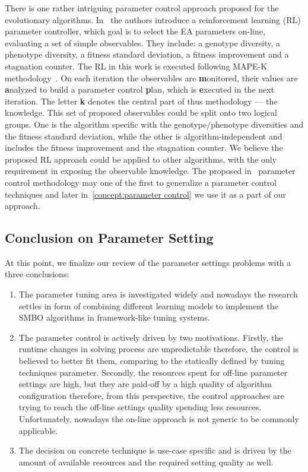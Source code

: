 There is one rather intriguing parameter control approach proposed for the evolutionary algorithms. In~\cite{karafotias2014generic} the authors introduce a reinforcement learning (RL) parameter controller, which goal is to select the EA parameters on-line, evaluating a set of simple observables. They include: a genotype diversity, a phenotype diversity, a fitness standard deviation, a fitness improvement and a stagnation counter.
The RL in this work is executed following MAPE-K methodology~\cite{brun2009engineering}. On each iteration the observables are \textbf{m}onitored, their values are \textbf{a}nalyzed to build a parameter control \textbf{p}lan, which is \textbf{e}xecuted in the next iteration. The letter \textbf{k} denotes the central part of thus methodology — the knowledge.
This set of proposed observables could be split onto two logical groups. One is the algorithm specific with the genotype/phenotype diversities and the fitness standard deviation, while the other is algorithm-independent and includes the fitness improvement and the stagnation counter. We believe the proposed RL approach could be applied to other algorithms, with the only requirement in exposing the observable knowledge. The proposed in~\cite{karafotias2014generic} parameter control methodology may one of the first to generalize a parameter control techniques and later in~\cref{concept:parameter control} we use it as a part of our approach.


\subsection{Conclusion on Parameter Setting}\label{bg: parameter setting conclution}
At this point, we finalize our review of the parameter settings problems with a three conclusions:
\begin{enumerate}
	\item The parameter tuning area is investigated widely and nowadays the research settles in form of combining different learning models to implement the SMBO algorithms in framework-like tuning systems.
	
	\item The parameter control is actively driven by two motivations. Firstly, the runtime changes in solving process are unpredictable therefore, the control is believed to better fit them, comparing to the statically defined by tuning techniques parameter. Secondly, the resources spent for off-line parameter settings are high, but they are paid-off by a high quality of algorithm configuration therefore, from this perspective, the control approaches are trying to reach the off-line settings quality spending less resources. Unfortunately, nowadays the on-line approach is not generic to be commonly applicable.
	
	\item The decision on concrete technique is use-case specific and is driven by the amount of available resources and the required setting quality as well.
\end{enumerate}


